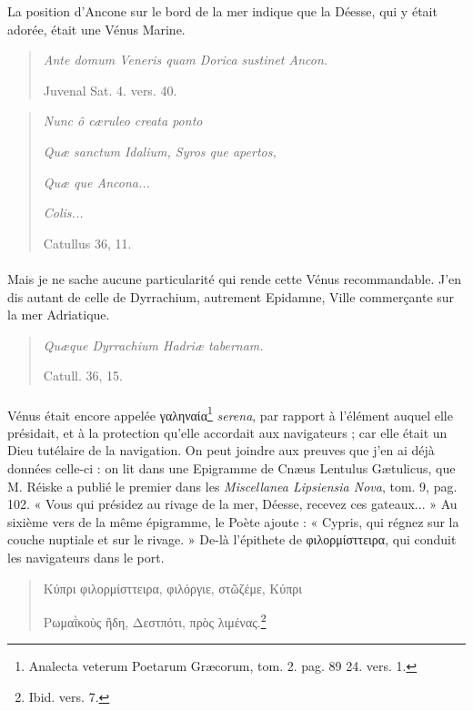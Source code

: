 \documentclass[a4paper, 18pt, oneside]{article}
\begin{document}
La position d'Ancone sur le bord de la mer indique que la Déesse, qui y était adorée, était une Vénus Marine.
\begin{quotation}
\emph{Ante domum Veneris quam Dorica sustinet Ancon.}

\hspace*{30mm}Juvenal Sat. 4. vers. 40.
\end{quotation}
\begin{quotation}
\emph{Nunc ô cæruleo creata ponto}

\emph{Quæ sanctum Idalium, Syros que apertos,}

\emph{Quæ que Ancona...}

\emph{Colis...}

\hspace*{30mm}Catullus 36, 11.
\end{quotation}
\paragraph{}
Mais je ne sache aucune particularité qui rende cette Vénus recommandable. J'en dis autant de celle de Dyrrachium, autrement Epidamne, Ville commerçante sur la mer Adriatique.
\begin{quotation}
\emph{Quæque Dyrrachium Hadriæ tabernam.}

\hspace*{30mm}Catull. 36, 15.
\end{quotation}
\paragraph{}
Vénus était encore appelée γαληναία\footnote{Analecta veterum Poetarum Græcorum, tom. 2. pag. 89 24. vers. 1.} \emph{serena}, par rapport à l'élément auquel elle présidait, et à la protection qu'elle accordait aux navigateurs ; car elle était un Dieu tutélaire de la navigation. On peut joindre aux preuves que j'en ai déjà données celle-ci : on lit dans une Epigramme de Cnæus Lentulus Gætulicus, que M. Réiske a publié le premier dans les \emph{Miscellanea Lipsiensia Nova}, tom. 9, pag. 102. « Vous qui présidez au rivage de la mer, Déesse, recevez ces gateaux... » Au sixième vers de la même épigramme, le Poète ajoute : « Cypris, qui régnez sur la couche nuptiale et sur le rivage. » De-là l'épithete de φιλορμίσττειρα, qui conduit les navigateurs dans le port.
\begin{quotation}
Κύπρι φιλορμίσττειρα, φιλόργιε, στῶζέμε, Κύπρι

Ρωμαῒκοὺς ἤδη, Δεστπότι, πρὸς λιμένας.\footnote{Ibid. vers. 7.}
\end{quotation}
\end{document}
